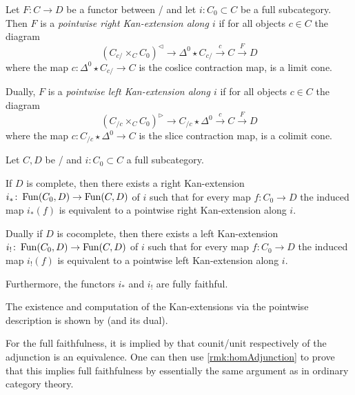 \begin{definition}\label{def:ptwiseKanExt} %
    Let $F\colon C\to D$ be a functor between \inftycats/ and let $i\colon C_0\subset C$ be a full subcategory.
    Then $F$ is a \emph{pointwise right Kan-extension along $i$} if for all objects $c\in C$ the diagram
    \begin{equation*}
        \left(C_{c/}\times_C C_0\right)^{\lhd}\to \Delta^0\star C_{c/}\xrightarrow{c} C\xrightarrow{F} D
    \end{equation*}
    where the map $c\colon\Delta^0\star C_{c/}\to C$ is the coslice contraction map, is a limit cone.

    Dually, $F$ is a \emph{pointwise left Kan-extension along $i$} if for all objects $c\in C$ the diagram
    \begin{equation*}
        \left(C_{/c}\times_C C_0\right)^{\rhd}\to C_{/c}\star\Delta^0 \xrightarrow{c} C\xrightarrow{F} D
    \end{equation*}
    where the map $c\colon C_{/c}\star\Delta^0\to C$ is the slice contraction map, is a colimit cone.
\end{definition}
\begin{prop}\label{prop:exKanExt}
    Let $C,D$ be \inftycats/ and $i\colon C_0\subset C$ a full subcategory.
    
    If $D$ is complete, then there exists a right Kan-extension $i_*\colon\operatorname{Fun}(C_0,D)\to\operatorname{Fun}(C,D)$ of $i$ such that for every map $f\colon C_0\to D$ the induced map $i_*(f)$ is equivalent to a pointwise right Kan-extension along $i$.

    Dually if $D$ is cocomplete, then there exists a left Kan-extension $i_!\colon\operatorname{Fun}(C_0,D)\to\operatorname{Fun}(C,D)$ of $i$ such that for every map $f\colon C_0\to D$ the induced map $i_!(f)$ is equivalent to a pointwise left Kan-extension along $i$.

    Furthermore, the functors $i_*$ and $i_!$ are fully faithful.
    \begin{reference}
        The existence and computation of the Kan-extensions via the pointwise description is shown by \cite[Proposition 6.4.9]{cisinski_2019} (and its dual).
        
        For the full faithfulness, it is implied by \cite[Corollary 7.3.1.16]{kerodon} that counit/unit respectively of the adjunction is an equivalence.
        One can then use \cref{rmk:homAdjunction} to prove that this implies full faithfulness by essentially the same argument as in ordinary category theory.
    \end{reference}
\end{prop}

